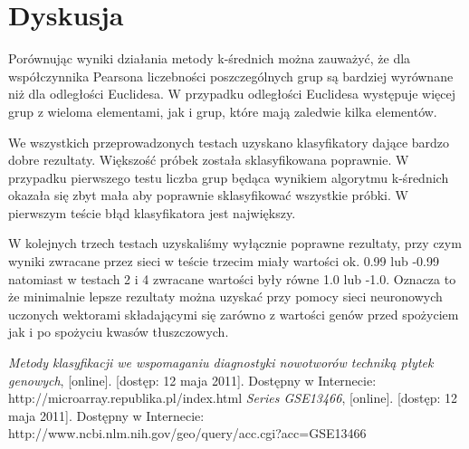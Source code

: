 \documentclass{classrep}
\begin{document}
\section{Dyskusja}
Porównując wyniki działania metody k-średnich można zauważyć, że dla współczynnika Pearsona liczebności poszczególnych grup są bardziej wyrównane niż dla odległości Euclidesa. W przypadku odległości Euclidesa występuje więcej grup z wieloma elementami, jak i grup, które mają zaledwie kilka elementów.

We wszystkich przeprowadzonych testach uzyskano klasyfikatory dające bardzo dobre rezultaty. Większość próbek została sklasyfikowana poprawnie. W przypadku pierwszego testu liczba grup będąca wynikiem algorytmu k-średnich okazała się zbyt mała aby poprawnie sklasyfikować wszystkie próbki. W pierwszym teście błąd klasyfikatora jest największy.

W kolejnych trzech testach uzyskaliśmy wyłącznie poprawne rezultaty, przy czym wyniki zwracane przez sieci w teście trzecim miały wartości ok. 0.99 lub -0.99 natomiast w testach 2 i 4 zwracane wartości były równe 1.0 lub -1.0. Oznacza to że minimalnie lepsze rezultaty można uzyskać przy pomocy sieci neuronowych uczonych wektorami składającymi się zarówno z wartości genów przed spożyciem jak i po spożyciu kwasów tłuszczowych.

\begin{thebibliography}{0}
\textit{Metody klasyfikacji we wspomaganiu diagnostyki nowotworów techniką płytek genowych}, [online]. [dostęp: 12 maja
2011]. Dostępny w Internecie: http://microarray.republika.pl/index.html
\textit{Series GSE13466}, [online]. [dostęp: 12 maja 2011].
Dostępny w Internecie: http://www.ncbi.nlm.nih.gov/geo/query/acc.cgi?acc=GSE13466
\end{thebibliography}
\end{document}
